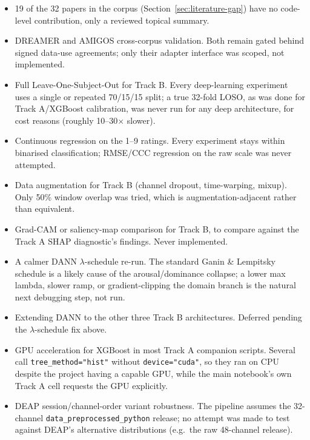 \documentclass[11pt]{report}
\begin{document}
\begin{itemize}
  \item 19 of the 32 papers in the corpus (Section~\ref{sec:literature-gap})
        have no code-level contribution, only a reviewed topical summary.
  \item DREAMER and AMIGOS cross-corpus validation. Both remain gated
        behind signed data-use agreements; only their adapter interface was
        scoped, not implemented.
  \item Full Leave-One-Subject-Out for Track B. Every deep-learning
        experiment uses a single or repeated 70/15/15 split; a true 32-fold
        LOSO, as was done for Track A/XGBoost calibration, was never run for
        any deep architecture, for cost reasons (roughly 10--30$\times$
        slower).
  \item Continuous regression on the 1--9 ratings. Every experiment stays
        within binarised classification; RMSE/CCC regression on the raw
        scale was never attempted.
  \item Data augmentation for Track B (channel dropout, time-warping,
        mixup). Only 50\% window overlap was tried, which is
        augmentation-adjacent rather than equivalent.
  \item Grad-CAM or saliency-map comparison for Track B, to compare against
        the Track A SHAP diagnostic's findings. Never implemented.
  \item A calmer DANN $\lambda$-schedule re-run. The standard Ganin \&
        Lempitsky schedule is a likely cause of the arousal/dominance
        collapse; a lower max lambda, slower ramp, or gradient-clipping the
        domain branch is the natural next debugging step, not run.
  \item Extending DANN to the other three Track B architectures. Deferred
        pending the $\lambda$-schedule fix above.
  \item GPU acceleration for XGBoost in most Track A companion scripts.
        Several call \texttt{tree\_method="hist"} without
        \texttt{device="cuda"}, so they ran on CPU despite the project
        having a capable GPU, while the main notebook's own Track A cell
        requests the GPU explicitly.
  \item DEAP session/channel-order variant robustness. The pipeline
        assumes the 32-channel \texttt{data\_preprocessed\_python} release;
        no attempt was made to test against DEAP's alternative
        distributions (e.g.\ the raw 48-channel release).
\end{itemize}
\end{document}
